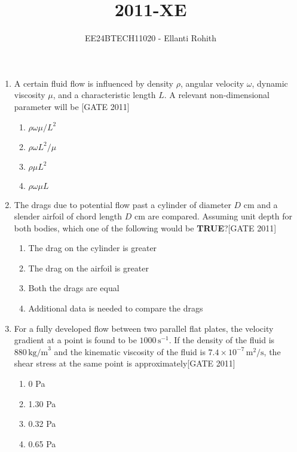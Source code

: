 \documentclass[journal,12pt,onecolumn]{IEEEtran}
\theoremstyle{remark}
\begin{document}

\vspace{3cm}

\title{2011-XE}
\author{EE24BTECH11020 -  Ellanti Rohith}
\maketitle

\renewcommand{\thefigure}{\theenumi}
\renewcommand{\thetable}{\theenumi}





\begin{enumerate}
   \item A certain fluid flow is influenced by density $\rho$, angular velocity $\omega$, dynamic viscosity $\mu$, and a characteristic length $L$. A relevant non-dimensional parameter will be \hfill{[GATE 2011]}
    \begin{multicols}{4}
    \begin{enumerate}
        \item $\rho \omega \mu / L^2$
        \item $\rho \omega L^2 / \mu$
        \item $\rho \mu L^2$
        \item $\rho \omega \mu L$
    \end{enumerate}
    \end{multicols}
    
\item The drags due to potential flow past a cylinder of diameter $D$ cm and a slender airfoil of chord length $D$ cm are compared. Assuming unit depth for both bodies, which one of the following would be \textbf{TRUE}?\hfill{[GATE 2011]}
    
    \begin{enumerate}
        \item The drag on the cylinder is greater
        \item The drag on the airfoil is greater
        \item Both the drags are equal
        \item Additional data is needed to compare the drags
    \end{enumerate}
        
    \item For a fully developed flow between two parallel flat plates, the velocity gradient at a point is found to be $1000 \, \text{s}^{-1}$. If the density of the fluid is $880 \, \text{kg/m}^3$ and the kinematic viscosity of the fluid is $7.4 \times 10^{-7} \, \text{m}^2/\text{s}$, the shear stress at the same point is approximately\hfill{[GATE 2011]}
    \begin{multicols}{4}
    \begin{enumerate}
        \item 0 Pa
        \item 1.30 Pa
        \item 0.32 Pa
        \item 0.65 Pa
    \end{enumerate}
    \end{multicols}
    

\end{enumerate}
\end{document}
